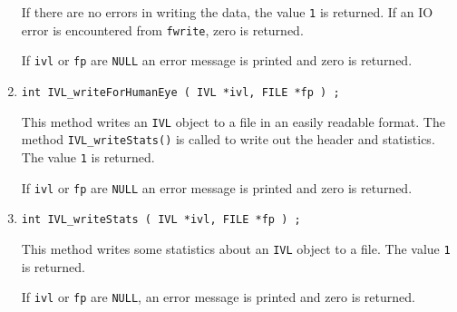\begin{enumerate}
If there are no errors in writing the data, 
the value {\tt 1} is returned.
If an IO error is encountered from {\tt fwrite}, zero is returned.
\par {}
If {\tt ivl} or {\tt fp} are {\tt NULL} an error message 
is printed and zero is returned.
\item
\begin{verbatim}
int IVL_writeForHumanEye ( IVL *ivl, FILE *fp ) ;
\end{verbatim}
\par
This method writes an {\tt IVL} object to a file in an easily
readable format.
The method {\tt IVL\_writeStats()} is called to write out the
header and statistics. 
The value {\tt 1} is returned.
\par {}
If {\tt ivl} or {\tt fp} are {\tt NULL} an error message 
is printed and zero is returned.
\item
\begin{verbatim}
int IVL_writeStats ( IVL *ivl, FILE *fp ) ;
\end{verbatim}
\par
This method writes some statistics about an {\tt IVL} object to a file.
The value {\tt 1} is returned.
\par {}
If {\tt ivl} or {\tt fp} are {\tt NULL},
an error message is printed and zero is returned.
\end{enumerate}
